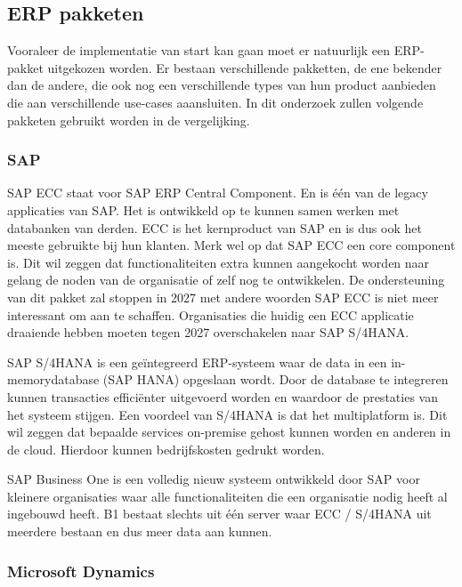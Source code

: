 \documentclass{hogent-article}
\begin{document}
\subsection{ERP pakketen}

Vooraleer de implementatie van start kan gaan moet er natuurlijk een ERP-pakket uitgekozen worden. Er bestaan verschillende pakketten, de ene bekender dan de andere, die ook nog een verschillende types van hun product aanbieden die aan verschillende use-cases aaansluiten. In dit onderzoek zullen volgende pakketen gebruikt worden in de vergelijking.\par

\subsubsection{SAP}
SAP ECC staat voor SAP ERP Central Component. En is één van de legacy applicaties van SAP. Het is ontwikkeld op te kunnen samen werken met databanken van derden. ECC is het kernproduct van SAP en is dus ook het meeste gebruikte bij hun klanten. Merk wel op dat SAP ECC een core component is. Dit wil zeggen dat functionaliteiten extra kunnen aangekocht worden naar gelang de noden van de organisatie of zelf nog te ontwikkelen. De ondersteuning van dit pakket zal stoppen in 2027 met andere woorden SAP ECC is niet meer interessant om aan te schaffen. Organisaties die huidig een ECC applicatie draaiende hebben moeten tegen 2027 overschakelen naar SAP S/4HANA.\par

SAP S/4HANA is een geïntegreerd ERP-systeem waar de data in een in-memorydatabase (SAP HANA) opgeslaan wordt. Door de database te integreren kunnen transacties efficiënter uitgevoerd worden en waardoor de prestaties van het systeem stijgen. Een voordeel van S/4HANA is dat het multiplatform is.  Dit wil zeggen dat bepaalde services on-premise gehost kunnen worden en anderen in de cloud. Hierdoor kunnen bedrijfskosten gedrukt worden. \autocite{Syntax2020} \par

SAP Business One is een volledig nieuw systeem ontwikkeld door SAP voor kleinere organisaties waar alle functionaliteiten die een organisatie nodig heeft al ingebouwd heeft. B1 bestaat slechts uit één server waar ECC / S/4HANA uit meerdere bestaan en dus meer data aan kunnen. \autocite{firebearstudio.com2021}\par

\subsubsection{Microsoft Dynamics}
\end{document}
